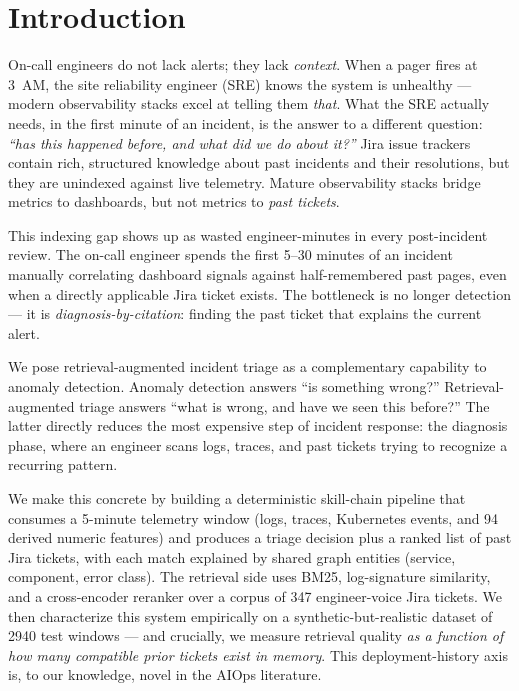 \section{Introduction}
\label{sec:intro}

On-call engineers do not lack alerts; they lack \emph{context}. When a pager fires at 3~AM, the site reliability engineer (SRE) knows the system is unhealthy --- modern observability stacks excel at telling them \emph{that}. What the SRE actually needs, in the first minute of an incident, is the answer to a different question: \emph{``has this happened before, and what did we do about it?''} Jira issue trackers contain rich, structured knowledge about past incidents and their resolutions, but they are unindexed against live telemetry. Mature observability stacks bridge metrics to dashboards, but not metrics to \emph{past tickets}.

This indexing gap shows up as wasted engineer-minutes in every post-incident review. The on-call engineer spends the first 5--30 minutes of an incident manually correlating dashboard signals against half-remembered past pages, even when a directly applicable Jira ticket exists. The bottleneck is no longer detection --- it is \emph{diagnosis-by-citation}: finding the past ticket that explains the current alert.

We pose retrieval-augmented incident triage as a complementary capability to anomaly detection. Anomaly detection answers ``is something wrong?'' Retrieval-augmented triage answers ``what is wrong, and have we seen this before?'' The latter directly reduces the most expensive step of incident response: the diagnosis phase, where an engineer scans logs, traces, and past tickets trying to recognize a recurring pattern.

We make this concrete by building a deterministic skill-chain pipeline that consumes a 5-minute telemetry window (logs, traces, Kubernetes events, and 94 derived numeric features) and produces a triage decision plus a ranked list of past Jira tickets, with each match explained by shared graph entities (service, component, error class). The retrieval side uses BM25, log-signature similarity, and a cross-encoder reranker over a corpus of 347 engineer-voice Jira tickets. We then characterize this system empirically on a synthetic-but-realistic dataset of 2940 test windows --- and crucially, we measure retrieval quality \emph{as a function of how many compatible prior tickets exist in memory}. This deployment-history axis is, to our knowledge, novel in the AIOps literature.

